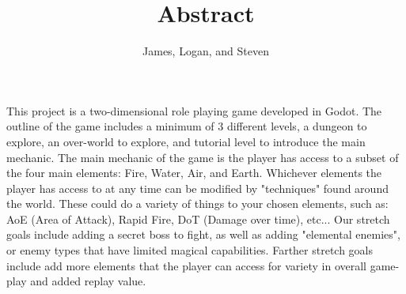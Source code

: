 \documentclass[12pt]{article}
\title{Abstract}
\author{James, Logan, and Steven}
\begin{document}
	\maketitle

	This project is a two-dimensional role playing game developed in Godot. The outline of the game includes a minimum of 3 different
	levels, a dungeon to explore, an over-world to explore, and tutorial level to introduce the main mechanic. The main mechanic of 
	the game is the player has access to a subset of the four main elements: Fire, Water, Air, and Earth. Whichever elements the
	player has access to at any time can be modified by "techniques" found around the world. These could do a variety of things
	to your chosen elements, such as: AoE (Area of Attack), Rapid Fire, DoT (Damage over time), etc...
	Our stretch goals include adding a secret boss to fight, as well as adding "elemental enemies", or enemy types that
	have limited magical capabilities. Farther stretch goals include add more elements that the player can access for
	variety in overall game-play and added replay value.
\end{document}
